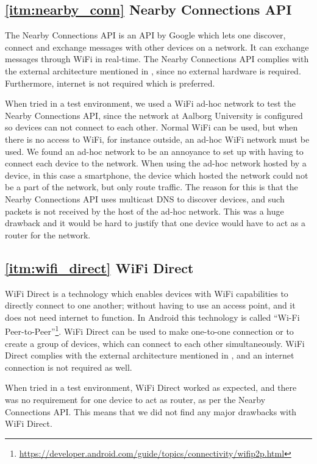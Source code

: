 \subsection*{\ref{itm:nearby_conn} Nearby Connections API}
The Nearby Connections API is an API by Google which lets one discover, connect and exchange messages with other devices on a network.
It can exchange messages through WiFi in real-time.\cite{nearby_connection}
The Nearby Connections API complies with the external architecture mentioned in ,
since no external hardware is required.
Furthermore, internet is not required which is preferred.

When tried in a test environment, we used a WiFi ad-hoc network to test the Nearby Connections API,
since the network at Aalborg University is configured so devices can not connect to each other.
Normal WiFi can be used, but when there is no access to WiFi, for instance outside, an ad-hoc WiFi network must be used.
We found an ad-hoc network to be an annoyance to set up with having to connect each device to the network.
When using the ad-hoc network hosted by a device, in this case a smartphone,
the device which hosted the network could not be a part of the network, but only route traffic.
The reason for this is that the Nearby Connections API uses multicast DNS to discover devices,
and such packets is not received by the host of the ad-hoc network.
This was a huge drawback and it would be hard to justify that one device would have to act as a router for the network.

\subsection*{\ref{itm:wifi_direct} WiFi Direct}
WiFi Direct is a technology which enables devices with WiFi capabilities to directly connect to one another;
without having to use an access point, and it does not need internet to function.
In Android this technology is called ``Wi-Fi Peer-to-Peer''\footnote{\url{https://developer.android.com/guide/topics/connectivity/wifip2p.html}}.
WiFi Direct can be used to make one-to-one connection or to create a group of devices,
which can connect to each other simultaneously.\cite{wifi_direct}
WiFi Direct complies with the external architecture mentioned in , and an internet connection is not required as well.

When tried in a test environment, WiFi Direct worked as expected,
and there was no requirement for one device to act as router, as per the Nearby Connections API\@.
This means that we did not find any major drawbacks with WiFi Direct.

